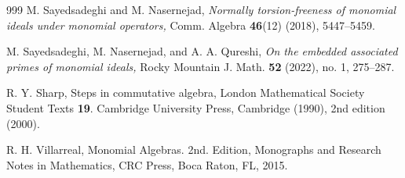 \documentclass[11pt]{amsart}
\begin{document}
\begin{thebibliography}{999}
   M. Sayedsadeghi and M. Nasernejad, {\it Normally torsion-freeness of monomial ideals under monomial operators,}  Comm. Algebra {\bf 46}(12) (2018),  5447--5459.


   M. Sayedsadeghi,  M. Nasernejad, and A. A. Qureshi,  {\it On the embedded associated primes of monomial ideals,}  
Rocky Mountain J. Math.  \textbf{52} (2022), no. 1, 275--287. 



   R. Y. Sharp, { Steps in commutative algebra,}  London Mathematical Society Student Texts  {\bf 19}. Cambridge University Press, Cambridge (1990), 2nd edition (2000).



  R. H. Villarreal, {Monomial Algebras.} 2nd. Edition, Monographs and Research Notes in Mathematics, CRC Press, Boca Raton, FL, 2015.
 

 \end{thebibliography}
 



\end{document}
